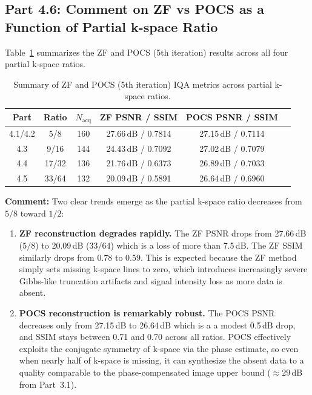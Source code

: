 \documentclass[12pt]{article}
\begin{document}
\subsection{Part 4.6: Comment on ZF vs POCS as a Function of Partial k-space Ratio}

Table~\ref{tab:p4_summary} summarizes the ZF and POCS (5th iteration) results across all four partial k-space ratios.

\begin{table}[H]
\centering
\begin{tabular}{|c|c|c|c|c|c|}
\hline
\textbf{Part} & \textbf{Ratio} & \textbf{$N_\text{acq}$} & \textbf{ZF PSNR / SSIM} & \textbf{POCS PSNR / SSIM} \\
\hline
4.1/4.2 & 5/8   & 160 & 27.66\,dB / 0.7814 & 27.15\,dB / 0.7114 \\
4.3     & 9/16  & 144 & 24.43\,dB / 0.7092 & 27.02\,dB / 0.7079 \\
4.4     & 17/32 & 136 & 21.76\,dB / 0.6373 & 26.89\,dB / 0.7033 \\
4.5     & 33/64 & 132 & 20.09\,dB / 0.5891 & 26.64\,dB / 0.6960 \\
\hline
\end{tabular}
\caption{Summary of ZF and POCS (5th iteration) IQA metrics across partial k-space ratios.}
\label{tab:p4_summary}
\end{table}

\textbf{Comment:} Two clear trends emerge as the partial k-space ratio decreases from $5/8$ toward $1/2$:

\begin{enumerate}
    \item \textbf{ZF reconstruction degrades rapidly.} The ZF PSNR drops from 27.66\,dB ($5/8$) to 20.09\,dB ($33/64$) which is a loss of more than 7.5\,dB. The ZF SSIM similarly drops from 0.78 to 0.59. This is expected because the ZF method simply sets missing k-space lines to zero, which introduces increasingly severe Gibbs-like truncation artifacts and signal intensity loss as more data is absent.

    \item \textbf{POCS reconstruction is remarkably robust.} The POCS PSNR decreases only from 27.15\,dB to 26.64\,dB which is a a modest 0.5\,dB drop, and SSIM stays between 0.71 and 0.70 across all ratios. POCS effectively exploits the conjugate symmetry of k-space via the phase estimate, so even when nearly half of k-space is missing, it can synthesize the absent data to a quality comparable to the phase-compensated image upper bound ($\approx 29$\,dB from Part~3.1).
\end{enumerate}
\end{document}
